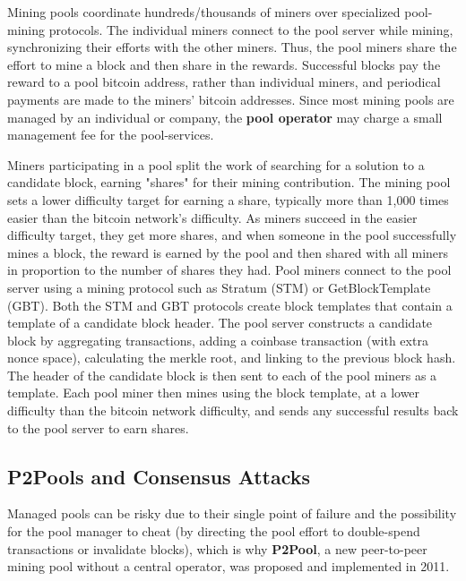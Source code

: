 \documentclass{article}
\begin{document}
    Mining pools coordinate hundreds/thousands of miners over specialized pool-mining protocols. The individual miners connect to the pool server while mining, synchronizing their efforts with the other miners. Thus, the pool miners share the effort to mine a block and then share in the rewards. Successful blocks pay the reward to a pool bitcoin address, rather than individual miners, and periodical payments are made to the miners' bitcoin addresses. Since most mining pools are managed by an individual or company, the \textbf{pool operator} may charge a small management fee for the pool-services.

    Miners participating in a pool split the work of searching for a solution to a candidate block, earning "shares" for their mining contribution. The mining pool sets a lower difficulty target for earning a share, typically more than 1,000 times easier than the bitcoin network's difficulty. As miners succeed in the easier difficulty target, they get more shares, and when someone in the pool successfully mines a block, the reward is earned by the pool and then shared with all miners in proportion to the number of shares they had. Pool miners connect to the pool server using a mining protocol such as Stratum (STM) or GetBlockTemplate (GBT). Both the STM and GBT protocols create block templates that contain a template of a candidate block header. The pool server constructs a candidate block by aggregating transactions, adding a coinbase transaction (with extra nonce space), calculating the merkle root, and linking to the previous block hash. The header of the candidate block is then sent to each of the pool miners as a template. Each pool miner then mines using the block template, at a lower difficulty than the bitcoin network difficulty, and sends any successful results back to the pool server to earn shares.

    \subsection{P2Pools and Consensus Attacks}

    Managed pools can be risky due to their single point of failure and the possibility for the pool manager to cheat (by directing the pool effort to double-spend transactions or invalidate blocks), which is why \textbf{P2Pool}, a new peer-to-peer mining pool without a central operator, was proposed and implemented in 2011.
\end{document}
